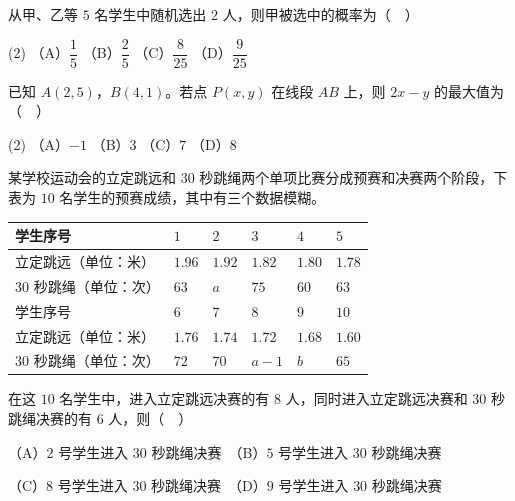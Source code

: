 \begin{question}
从甲、乙等 \(5\) 名学生中随机选出 \(2\) 人，则甲被选中的概率为（　）

\begin{gkopts}(2)
\task （A）\(\dfrac{1}{5}\)
\task （B）\(\dfrac{2}{5}\)
\task （C）\(\dfrac{8}{25}\)
\task （D）\(\dfrac{9}{25}\)
\end{gkopts}

\end{question}
\begin{question}
已知 \(A(2,5)\)，\(B(4,1)\)。若点 \(P(x,y)\) 在线段 \(AB\) 上，则 \(2x-y\) 的最大值为（　）

\begin{gkopts}(2)
\task （A）\(-1\)
\task （B）\(3\)
\task （C）\(7\)
\task （D）\(8\)
\end{gkopts}

\end{question}
\begin{question}
某学校运动会的立定跳远和 \(30\) 秒跳绳两个单项比赛分成预赛和决赛两个阶段，下表为 \(10\) 名学生的预赛成绩，其中有三个数据模糊。

\begin{center}
\begin{tabular}{llllll}
\toprule
学生序号 & \(1\) & \(2\) & \(3\) & \(4\) & \(5\) \\
\midrule
立定跳远（单位：米） & \(1.96\) & \(1.92\) & \(1.82\) & \(1.80\) & \(1.78\) \\
\(30\) 秒跳绳（单位：次） & \(63\) & \(a\) & \(75\) & \(60\) & \(63\) \\
学生序号 & \(6\) & \(7\) & \(8\) & \(9\) & \(10\) \\
立定跳远（单位：米） & \(1.76\) & \(1.74\) & \(1.72\) & \(1.68\) & \(1.60\) \\
\(30\) 秒跳绳（单位：次） & \(72\) & \(70\) & \(a-1\) & \(b\) & \(65\) \\
\bottomrule
\end{tabular}
\end{center}

在这 \(10\) 名学生中，进入立定跳远决赛的有 \(8\) 人，同时进入立定跳远决赛和 \(30\) 秒跳绳决赛的有 \(6\) 人，则（　）

（A）\(2\) 号学生进入 \(30\) 秒跳绳决赛　（B）\(5\) 号学生进入 \(30\) 秒跳绳决赛

（C）\(8\) 号学生进入 \(30\) 秒跳绳决赛　（D）\(9\) 号学生进入 \(30\) 秒跳绳决赛

\end{question}

